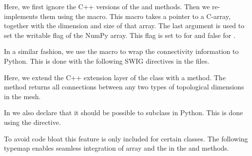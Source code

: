 \pagebreak

\noindent Here, we first ignore the C++ versions of the  and
 methods. Then we re-implements them using the
 macro. This macro takes a pointer to a
C-array, together with the dimension and size of that array. The last
argument is used to set the writable flag of the NumPy array. This
flag is set to  for  and false for
.

In a similar fashion, we use the  macro to wrap
the connectivity information to Python. This is done with the
following SWIG directives in the  files.\vspace*{3pt}

\vspace*{5pt}

\noindent Here, we extend the C++ extension layer of the
 class with a 
method. The method returns all connections between any two types of
topological dimensions in the mesh.

In  we also declare that it should be possible to
subclass  in Python. This is done using the
 directive.\vspace*{3pt}
\begin{swigcode}
\end{swigcode}

\vspace*{5pt}

\noindent To avoid code bloat this feature is only included for certain classes.
The following typemap enables seamless integration of \numpy array and
the  in the  and  methods.\vspace*{3pt}

\vspace*{5pt}

